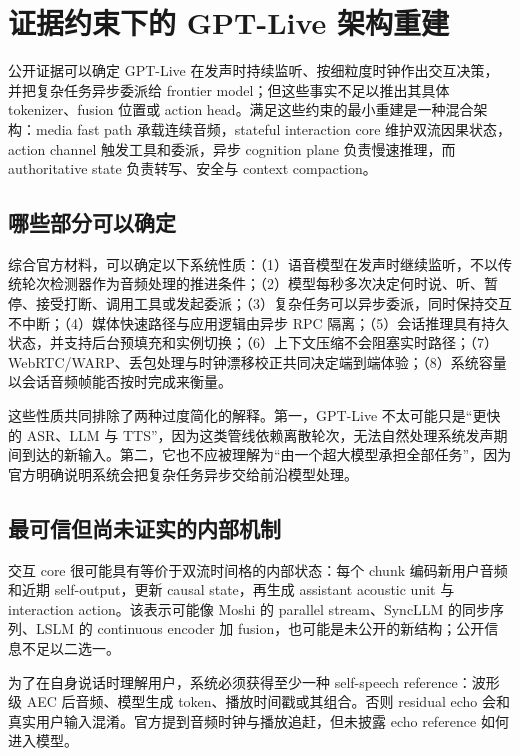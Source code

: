 \section{证据约束下的 GPT-Live 架构重建}

公开证据可以确定 GPT-Live 在发声时持续监听、按细粒度时钟作出交互决策，并把复杂任务异步委派给 frontier model；但这些事实不足以推出其具体 tokenizer、fusion 位置或 action head。满足这些约束的最小重建是一种混合架构：media fast path 承载连续音频，stateful interaction core 维护双流因果状态，action channel 触发工具和委派，异步 cognition plane 负责慢速推理，而 authoritative state 负责转写、安全与 context compaction。

\subsection{哪些部分可以确定}

综合官方材料，可以确定以下系统性质：\FOne（1）语音模型在发声时继续监听，不以传统轮次检测器作为音频处理的推进条件；（2）模型每秒多次决定何时说、听、暂停、接受打断、调用工具或发起委派；（3）复杂任务可以异步委派，同时保持交互不中断；（4）媒体快速路径与应用逻辑由异步 RPC 隔离；（5）会话推理具有持久状态，并支持后台预填充和实例切换；（6）上下文压缩不会阻塞实时路径；（7）WebRTC/WARP、丢包处理与时钟漂移校正共同决定端到端体验；（8）系统容量以会话音频帧能否按时完成来衡量\cite{openai2026gptlive,openai2026continuous}。

这些性质共同排除了两种过度简化的解释。第一，GPT-Live 不太可能只是“更快的 ASR、LLM 与 TTS”，因为这类管线依赖离散轮次，无法自然处理系统发声期间到达的新输入。第二，它也不应被理解为“由一个超大模型承担全部任务”，因为官方明确说明系统会把复杂任务异步交给前沿模型处理。

\subsection{最可信但尚未证实的内部机制}

\Hyp 交互 core 很可能具有等价于双流时间格的内部状态：每个 chunk 编码新用户音频和近期 self-output，更新 causal state，再生成 assistant acoustic unit 与 interaction action。该表示可能像 Moshi 的 parallel stream、SyncLLM 的同步序列、LSLM 的 continuous encoder 加 fusion，也可能是未公开的新结构；公开信息不足以二选一。

\Hyp 为了在自身说话时理解用户，系统必须获得至少一种 self-speech reference：波形级 AEC 后音频、模型生成 token、播放时间戳或其组合。否则 residual echo 会和真实用户输入混淆。官方提到音频时钟与播放追赶，但未披露 echo reference 如何进入模型。

